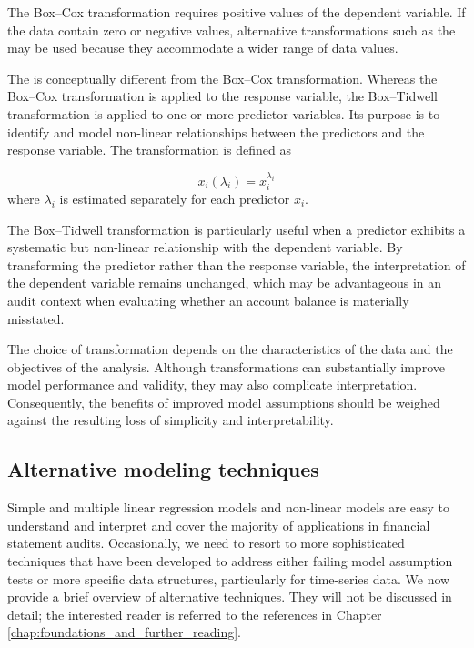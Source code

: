 \bigskip

The Box--Cox transformation requires positive values of the dependent variable. If the data contain zero or negative values, alternative transformations such as the  may be used because they accommodate a wider range of data values.

\bigskip

The  is conceptually different from the Box--Cox transformation. Whereas the Box--Cox transformation is applied to the response variable, the Box--Tidwell transformation is applied to one or more predictor variables. Its purpose is to identify and model non-linear relationships between the predictors and the response variable. The transformation is defined as

\begin{equation}
x_i(\lambda_i)=x_i^{\lambda_i}
\end{equation}
where \(\lambda_i\) is estimated separately for each predictor \(x_i\).

The Box--Tidwell transformation is particularly useful when a predictor exhibits a systematic but non-linear relationship with the dependent variable. By transforming the predictor rather than the response variable, the interpretation of the dependent variable remains unchanged, which may be advantageous in an audit context when evaluating whether an account balance is materially misstated.

\bigskip

The choice of transformation depends on the characteristics of the data and the objectives of the analysis. Although transformations can substantially improve model performance and validity, they may also complicate interpretation. Consequently, the benefits of improved model assumptions should be weighed against the resulting loss of simplicity and interpretability.

\subsection{Alternative modeling techniques} %
\label{sub:alternative_modeling_techniques}

Simple and multiple linear regression models and non-linear models are easy to understand and interpret and cover the majority of applications in financial statement audits. Occasionally, we need to resort to more sophisticated techniques that have been developed to address either failing model assumption tests or more specific data structures, particularly for time-series data. We now provide a brief overview of alternative techniques. They will not be discussed in detail; the interested reader is referred to the references in Chapter \ref{chap:foundations_and_further_reading}.


